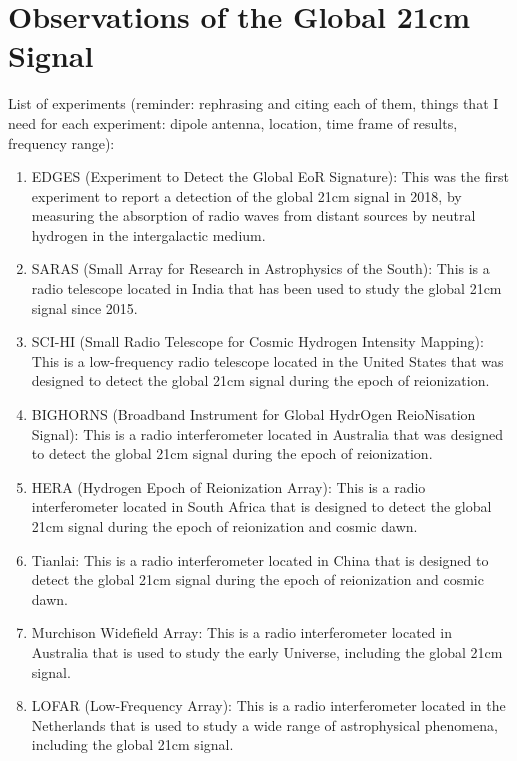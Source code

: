\documentclass[12pt, TexShade, letterpaper]{report}
\begin{document}
\chapter{Observations of the Global 21cm Signal}
\label{chap:observations}
List of experiments (reminder: rephrasing and citing each of them,  things that I need for each experiment: dipole antenna, location, time frame of results, frequency range):\par
\begin{enumerate}
\item EDGES (Experiment to Detect the Global EoR Signature): This was the first experiment to report a detection of the global 21cm signal in 2018, by measuring the absorption of radio waves from distant sources by neutral hydrogen in the intergalactic medium.

\item SARAS (Small Array for Research in Astrophysics of the South): This is a radio telescope located in India that has been used to study the global 21cm signal since 2015.

\item SCI-HI (Small Radio Telescope for Cosmic Hydrogen Intensity Mapping): This is a low-frequency radio telescope located in the United States that was designed to detect the global 21cm signal during the epoch of reionization.

\item BIGHORNS (Broadband Instrument for Global HydrOgen ReioNisation Signal): This is a radio interferometer located in Australia that was designed to detect the global 21cm signal during the epoch of reionization.

\item HERA (Hydrogen Epoch of Reionization Array): This is a radio interferometer located in South Africa that is designed to detect the global 21cm signal during the epoch of reionization and cosmic dawn.

\item Tianlai: This is a radio interferometer located in China that is designed to detect the global 21cm signal during the epoch of reionization and cosmic dawn.

\item Murchison Widefield Array: This is a radio interferometer located in Australia that is used to study the early Universe, including the global 21cm signal.

\item LOFAR (Low-Frequency Array): This is a radio interferometer located in the Netherlands that is used to study a wide range of astrophysical phenomena, including the global 21cm signal.


\end{enumerate}
\end{document}
